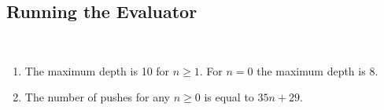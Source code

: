 \subsection{Running the Evaluator}

\begin{exe}[5.26]
    \ \vspace{-20pt}
    \begin{enumerate}
	\item The maximum depth is 10 for $n \geq 1$. For $n = 0$ the maximum 
	depth is 8.

    \item The number of pushes for any $n \geq 0$ is equal to $35n + 29$.
    \end{enumerate}
\end{exe}
